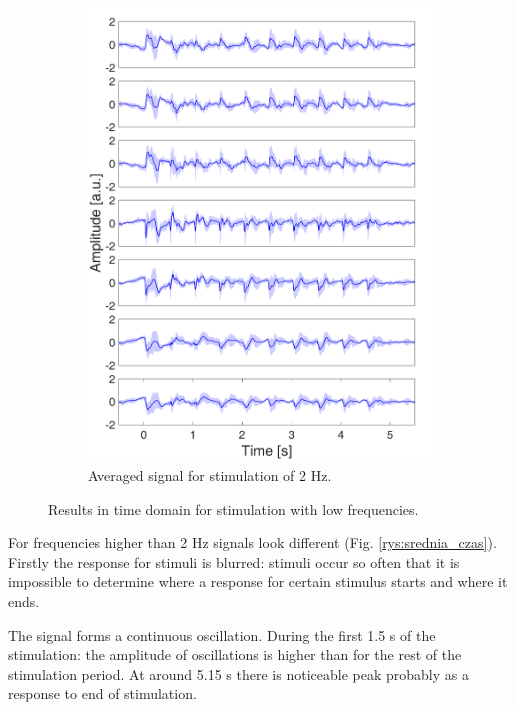 \documentclass{pracalicmgr}
\begin{document}
\begin{figure}[H]
\begin{subfigure}{.5\textwidth}
		\includegraphics[width=1.\linewidth]{srednie_2Hz_5s.png}
		\caption{Averaged signal for stimulation of 2 Hz.}
		\label{rys:srednie_2Hz}
	\end{subfigure}
	\caption{Results in time domain for stimulation with low frequencies.}
	\label{rys:srednie_1_2}
	\end{figure}
    
    For frequencies higher than 2 Hz signals look different (Fig. \ref{rys:srednia_czas}). Firstly the response for stimuli is blurred: stimuli occur so often that it is impossible to determine where a response for certain stimulus starts and where it ends. 
    
    
    The signal forms a continuous oscillation. During the first 1.5 s of the stimulation: the amplitude of oscillations is higher than for the rest of the stimulation period. At around 5.15 s there is noticeable peak probably as a response to end of stimulation. 
    
\end{document}
